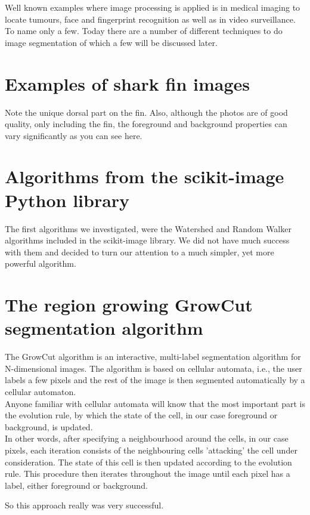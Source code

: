 \documentclass[a4paper,10pt]{article}
\begin{document}
Well known
examples where image processing is applied is in medical imaging to locate
tumours, face and fingerprint recognition as well as in video surveillance.  To
name only a few.  Today there are a number of different techniques to do image
segmentation of which a few will be discussed later.


\section{Examples of shark fin images}
Note the unique dorsal part on the fin.  Also, although the photos are of good
quality, only including the fin, the foreground and background properties can
vary significantly as you can see here.


\section{Algorithms from the scikit-image Python library}
The first algorithms we investigated, were the Watershed and Random Walker
algorithms included in the scikit-image library.  We did not have much success
with them and decided to turn our attention to a much simpler, yet more powerful
algorithm.


\section{The region growing GrowCut segmentation algorithm}
The GrowCut algorithm is an interactive, multi-label segmentation
algorithm for N-dimensional images.  The algorithm is based on cellular
automata, i.e.,  the user labels a few pixels and the rest of the image is then
segmented automatically by a cellular automaton. \\

Anyone familiar with cellular automata will know that the most important part
is the evolution rule, by which the state of the cell, in our case foreground or
background, is updated.  \\

In other words, after specifying a neighbourhood around the cells, in our case pixels, each iteration consists of
the neighbouring cells 'attacking' the cell under consideration.  The state of this cell is then updated
according to the evolution rule. This procedure then iterates throughout the image until each pixel has a label, either foreground or background.

So this approach really was very successful.\\
\end{document}
